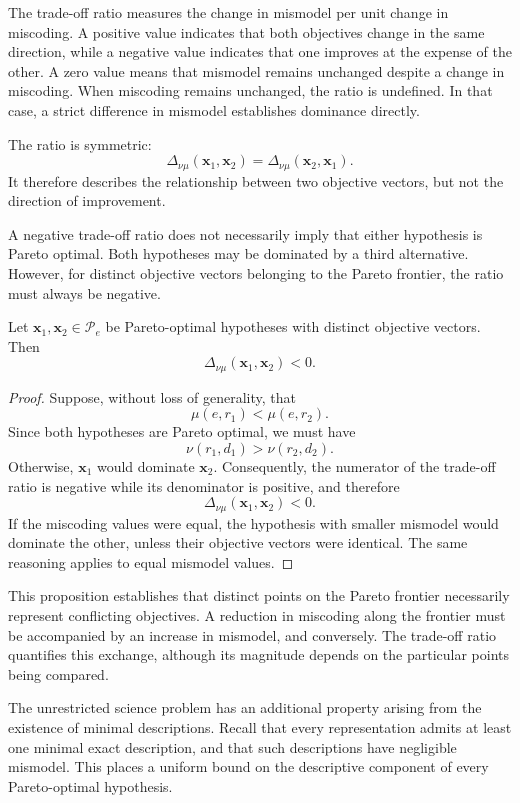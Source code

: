 The trade-off ratio measures the change in mismodel per unit change in miscoding. A positive value indicates that both objectives change in the same direction, while a negative value indicates that one improves at the expense of the other. A zero value means that mismodel remains unchanged despite a change in miscoding. When miscoding remains unchanged, the ratio is undefined. In that case, a strict difference in mismodel establishes dominance directly.

The ratio is symmetric:
\[
\Delta_{\nu\mu}(\mathbf{x}_1,\mathbf{x}_2) = \Delta_{\nu\mu}(\mathbf{x}_2,\mathbf{x}_1).
\]
It therefore describes the relationship between two objective vectors, but not the direction of improvement.

A negative trade-off ratio does not necessarily imply that either hypothesis is Pareto optimal. Both hypotheses may be dominated by a third alternative. However, for distinct objective vectors belonging to the Pareto frontier, the ratio must always be negative.

\begin{proposition}
Let $\mathbf{x}_1,\mathbf{x}_2\in\mathcal P_e$ be Pareto-optimal hypotheses with distinct objective vectors.
Then 
\[
\Delta_{\nu\mu}(\mathbf{x}_1,\mathbf{x}_2) < 0.
\]
\end{proposition}

\begin{proof}
Suppose, without loss of generality, that
\[
\mu(e,r_1)<\mu(e,r_2).
\]
Since both hypotheses are Pareto optimal, we must have
\[
\nu(r_1,d_1)>\nu(r_2,d_2).
\]
Otherwise, $\mathbf{x}_1$ would dominate $\mathbf{x}_2$. Consequently, the numerator of the trade-off ratio is
negative while its denominator is positive, and therefore
\[
\Delta_{\nu\mu}(\mathbf{x}_1,\mathbf{x}_2)<0.
\]
If the miscoding values were equal, the hypothesis with smaller mismodel would dominate the other, unless their objective vectors were identical. The same reasoning applies to equal mismodel values.
\end{proof}

This proposition establishes that distinct points on the Pareto frontier necessarily represent conflicting objectives. A reduction in miscoding along the frontier must be accompanied by an increase in mismodel, and conversely. The trade-off ratio quantifies this exchange, although its magnitude depends on the particular points being compared.

The unrestricted science problem has an additional property arising from the existence of minimal descriptions.
Recall that every representation admits at least one minimal exact description, and that such descriptions
have negligible mismodel. This places a uniform bound on the descriptive component of every Pareto-optimal hypothesis.

